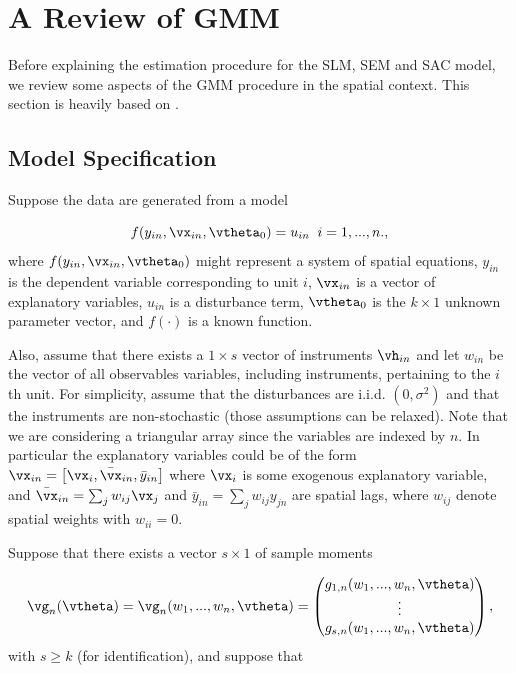 \documentclass[english,12pt]{book}\usepackage[]{graphicx}\usepackage[]{xcolor}
\begin{document}
\section{A Review of GMM}

Before explaining the estimation procedure for the SLM, SEM and SAC model, we review some aspects of the GMM procedure in the spatial context. This section is heavily based on \cite{pruchaHB}.

\subsection{Model Specification}

Suppose the data are generated from a model

\begin{equation*}
f(y_{in}, \vx_{in}, \vtheta_0) = u_{in}\;\;i = 1,...,n. , 
\end{equation*}
%
where $f(y_{in}, \vx_{in}, \vtheta_0)$ might represent a system of spatial equations, $y_{in}$ is the dependent variable corresponding to unit $i$, $\vx_{in}$ is a vector of explanatory variables, $u_{in}$ is a disturbance term, $\vtheta_0$ is the $k \times 1$ unknown parameter vector, and $f(\cdot)$ is a known function. 


Also, assume that there exists a $1 \times s$ vector of instruments $\vh_{in}$ and let $w_{in}$ be the vector of all observables variables, including instruments, pertaining to the $i$th unit. For simplicity, assume that the disturbances are i.i.d. $(0, \sigma^2)$ and that the instruments are non-stochastic (those assumptions can be relaxed). Note that we are considering a triangular array since the variables are indexed by $n$. In particular the explanatory variables could be of the form $\vx_{in} = \left[\vx_i, \bar{\vx}_{in}, \bar{y}_{in} \right]$ where $\vx_i$ is some exogenous explanatory variable, and $\bar{\vx}_{in} = \sum_jw_{ij}\vx_j$ and $\bar{y}_{in} = \sum_jw_{ij}y_{jn}$ are spatial lags, where $w_{ij}$ denote spatial weights with $w_{ii} = 0$. 

Suppose that there exists a vector $s \times 1$ of sample moments

\begin{equation*}
\vg_n(\vtheta) = \vg_n(w_1,...,w_n, \vtheta) = \begin{pmatrix}
g_{1,n}(w_1,...,w_n, \vtheta) \\
\vdots \\
g_{s,n}(w_1,...,w_n, \vtheta)
\end{pmatrix},
\end{equation*}
%
with $s \geq k$ (for identification), and suppose that
\end{document}
